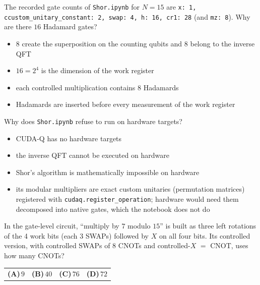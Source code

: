 \documentclass[11pt,a4paper]{article}
\newcommand{\optlabel}[1]{\textbf{(#1)}}
\newenvironment{qitem}[1]{\begin{list}{}{\setlength{\leftmargin}{3.3em}\setlength{\labelwidth}{3.1em}%
  \setlength{\labelsep}{0.2em}\setlength{\topsep}{3pt}\setlength{\parsep}{3pt}}\item[\textbf{Q.#1}\hfill]}{\end{list}}
\newcommand{\qsep}{\par\vspace{2pt}{\color{black!15}\hrule}\vspace{4pt}}
\begin{document}
\begin{qitem}{67}
The recorded gate counts of \texttt{Shor.ipynb} for $N = 15$ are \texttt{x: 1, ccustom\_unitary\_constant: 2, swap: 4, h: 16, cr1: 28} (and
\texttt{mz: 8}). Why are there $16$ Hadamard gates?
\begin{itemize}[leftmargin=2.6em, labelsep=0.4em, itemsep=2pt, topsep=3pt]
\item[\optlabel{A}] $8$ create the superposition on the counting qubits and $8$ belong to the inverse QFT
\item[\optlabel{B}] $16 = 2^4$ is the dimension of the work register
\item[\optlabel{C}] each controlled multiplication contains $8$ Hadamards
\item[\optlabel{D}] Hadamards are inserted before every measurement of the work register
\end{itemize}
\end{qitem}
\qsep

\begin{qitem}{68}
Why does \texttt{Shor.ipynb} refuse to run on hardware targets?
\begin{itemize}[leftmargin=2.6em, labelsep=0.4em, itemsep=2pt, topsep=3pt]
\item[\optlabel{A}] CUDA-Q has no hardware targets
\item[\optlabel{B}] the inverse QFT cannot be executed on hardware
\item[\optlabel{C}] Shor's algorithm is mathematically impossible on hardware
\item[\optlabel{D}] its modular multipliers are exact custom unitaries (permutation matrices) registered with \texttt{cudaq.register\_operation}; hardware would need them decomposed into native gates, which the notebook does not do
\end{itemize}
\end{qitem}
\qsep

\begin{qitem}{69}
In the gate-level circuit, ``multiply by $7$ modulo $15$'' is built as three left rotations of the 4 work bits (each $3$ SWAPs) followed by $X$ on all
four bits. Its controlled version, with controlled SWAPs of $8$ CNOTs and controlled-$X$ $=$ CNOT, uses how many CNOTs?
\par\smallskip\noindent\begin{tabularx}{\linewidth}{@{}*{4}{L}@{}}
\optlabel{A}\,$9$ & \optlabel{B}\,$40$ & \optlabel{C}\,$76$ & \optlabel{D}\,$72$
\end{tabularx}
\end{qitem}
\qsep
\end{document}
